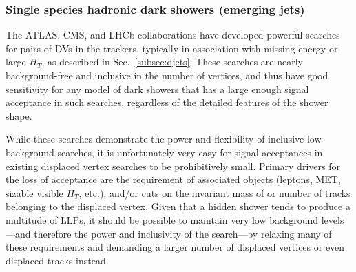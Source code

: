 \subsubsection{Single species hadronic dark showers (emerging jets)}
\label{sec:darkshoweremergingjets}

The ATLAS, CMS, and LHCb collaborations have developed powerful searches for pairs of DVs in the trackers, typically in association with missing energy or large $H_T$, as described in Sec.~\ref{subsec:djets}. These searches are nearly background-free and inclusive in the number of vertices, and thus have good sensitivity for any model of dark showers that has a large enough signal acceptance in such searches, regardless of the detailed features of the shower shape.

While these searches demonstrate the power and flexibility of inclusive low-background searches, it is unfortunately very easy for signal acceptances in existing displaced vertex searches to be prohibitively small.  Primary drivers for the loss of acceptance are the requirement of associated objects (leptons, MET, sizable visible $H_T$, etc.), and/or cuts on the invariant mass of or number of tracks belonging to the displaced vertex. Given that a hidden shower tends to produce a multitude of LLPs, it should be possible to maintain very low background levels---and therefore the power and inclusivity of the search---by relaxing many of these requirements and demanding a larger number of displaced vertices or even displaced tracks instead.

